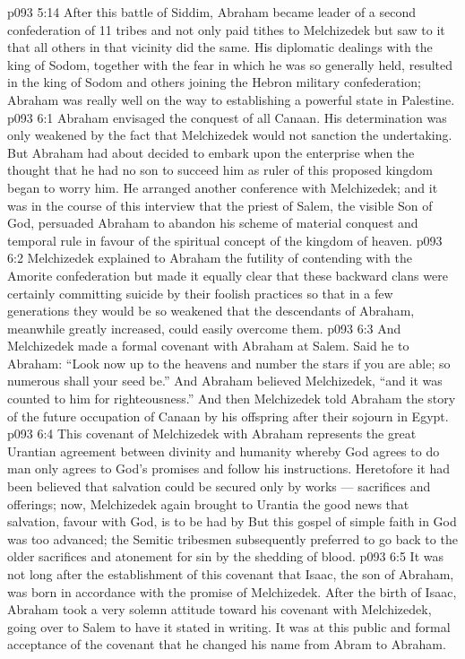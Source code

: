 \vs p093 5:14 After this battle of Siddim, Abraham became leader of a second confederation of 11 tribes and not only paid tithes to Melchizedek but saw to it that all others in that vicinity did the same. His diplomatic dealings with the king of Sodom, together with the fear in which he was so generally held, resulted in the king of Sodom and others joining the Hebron military confederation; Abraham was really well on the way to establishing a powerful state in Palestine.
\vs p093 6:1 Abraham envisaged the conquest of all Canaan. His determination was only weakened by the fact that Melchizedek would not sanction the undertaking. But Abraham had about decided to embark upon the enterprise when the thought that he had no son to succeed him as ruler of this proposed kingdom began to worry him. He arranged another conference with Melchizedek; and it was in the course of this interview that the priest of Salem, the visible Son of God, persuaded Abraham to abandon his scheme of material conquest and temporal rule in favour of the spiritual concept of the kingdom of heaven.
\vs p093 6:2 Melchizedek explained to Abraham the futility of contending with the Amorite confederation but made it equally clear that these backward clans were certainly committing suicide by their foolish practices so that in a few generations they would be so weakened that the descendants of Abraham, meanwhile greatly increased, could easily overcome them.
\vs p093 6:3 And Melchizedek made a formal covenant with Abraham at Salem. Said he to Abraham: “Look now up to the heavens and number the stars if you are able; so numerous shall your seed be.” And Abraham believed Melchizedek, “and it was counted to him for righteousness.” And then Melchizedek told Abraham the story of the future occupation of Canaan by his offspring after their sojourn in Egypt.
\vs p093 6:4 \pc This covenant of Melchizedek with Abraham represents the great Urantian agreement between divinity and humanity whereby God agrees to do  man only agrees to  God’s promises and follow his instructions. Heretofore it had been believed that salvation could be secured only by works --- sacrifices and offerings; now, Melchizedek again brought to Urantia the good news that salvation, favour with God, is to be had by  But this gospel of simple faith in God was too advanced; the Semitic tribesmen subsequently preferred to go back to the older sacrifices and atonement for sin by the shedding of blood.
\vs p093 6:5 It was not long after the establishment of this covenant that Isaac, the son of Abraham, was born in accordance with the promise of Melchizedek. After the birth of Isaac, Abraham took a very solemn attitude toward his covenant with Melchizedek, going over to Salem to have it stated in writing. It was at this public and formal acceptance of the covenant that he changed his name from Abram to Abraham.
